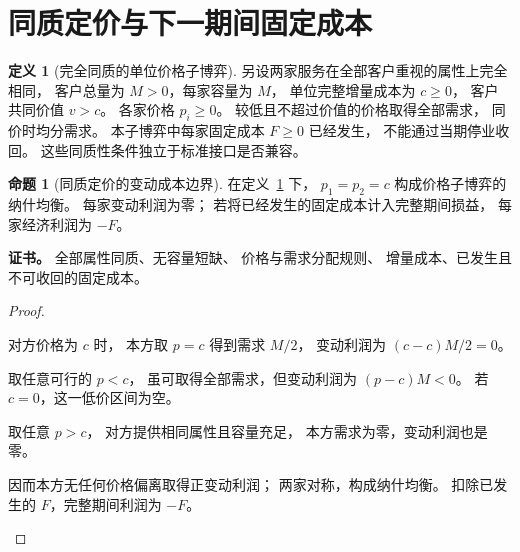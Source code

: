 \documentclass[UTF8,12pt,a4paper,openany,fontset=none,zihao=false]{ctexrep}
\theoremstyle{definition}
\newtheorem{definition}{定义}[chapter]
\newtheorem{proposition}{命题}[chapter]
\newenvironment{certificate}{\par\noindent\textbf{证书。}\ignorespaces}{\par}
\newcommand{\1}{\mathbf 1}
\begin{document}
\section{同质定价与下一期间固定成本}

\begin{definition}[完全同质的单位价格子博弈]
\label{comp:homogeneous-data}
另设两家服务在全部客户重视的属性上完全相同，
客户总量为 \(M>0\)，每家容量为 \(M\)，
单位完整增量成本为 \(c\ge0\)，
客户共同价值 \(v>c\)。
各家价格 \(p_i\ge0\)。
较低且不超过价值的价格取得全部需求，
同价时均分需求。
本子博弈中每家固定成本 \(F\ge0\) 已经发生，
不能通过当期停业收回。
这些同质性条件独立于标准接口是否兼容。
\end{definition}

\begin{proposition}[同质定价的变动成本边界]
\label{comp:homogeneous-price}
在定义~\ref{comp:homogeneous-data} 下，
\(p_1=p_2=c\) 构成价格子博弈的纳什均衡。
每家变动利润为零；
若将已经发生的固定成本计入完整期间损益，
每家经济利润为 \(-F\)。
\end{proposition}
\begin{certificate}
全部属性同质、无容量短缺、
价格与需求分配规则、
增量成本、已发生且不可收回的固定成本。
\end{certificate}
\begin{proof}
\begin{semanticsteps}
\item 对方价格为 \(c\) 时，
本方取 \(p=c\) 得到需求 \(M/2\)，
变动利润为 \((c-c)M/2=0\)。
\item 取任意可行的 \(p<c\)，
虽可取得全部需求，但变动利润为
\((p-c)M<0\)。
若 \(c=0\)，这一低价区间为空。
\item 取任意 \(p>c\)，
对方提供相同属性且容量充足，
本方需求为零，变动利润也是零。
\item 因而本方无任何价格偏离取得正变动利润；
两家对称，构成纳什均衡。
扣除已发生的 \(F\)，完整期间利润为 \(-F\)。
\end{semanticsteps}
\end{proof}
\end{document}
